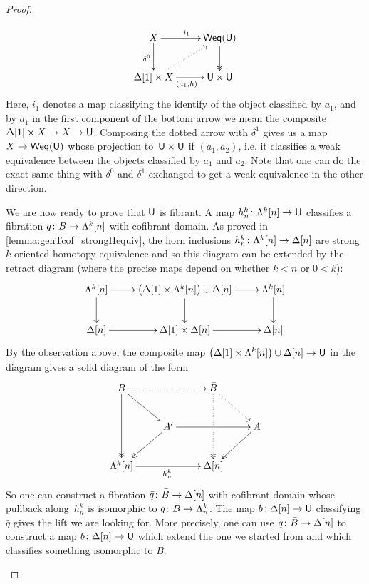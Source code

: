 \documentclass[reqno,10pt,a4paper,oneside,draft]{amsart}
\begin{document}
\begin{proof}
\begin{enumerate}[(i)]
\[
\xymatrix{ X \ar[r]^{i_1} \ar[d]_{\delta^0} & \mathsf{Weq}(\U) \ar@{->>}[d] \\
\Delta[1] \times X \ar[r]_{(a_1,h)} \ar@{.>}[ur] & \U \times \U
}
\]
Here, $i_1$ denotes a map classifying the identify of the object classified by $a_1$, and by $a_1$ in the first component of the bottom arrow we mean the composite $\Delta[1] \times X \rightarrow X \rightarrow \mathsf{U}$. Composing the dotted arrow with $\delta^1$ gives us a map $X \rightarrow  \mathsf{Weq}(\mathsf{U})$ whose projection to~$\mathsf{U} \times \mathsf{U}$ if $(a_1,a_2)$, i.e. it classifies a weak equivalence between the objects classified by $a_1$ and $a_2$. Note that one can do the exact same thing with $\delta^0$ and $\delta^1$ exchanged to get a weak equivalence in the other direction.


We are now ready to prove that $\mathsf{U}$ is fibrant. A map $h^k_n \colon \Lambda^k[n] \rightarrow \mathsf{U} $ classifies a fibration $q \colon B \rightarrow \Lambda^k[n]$ with cofibrant domain. As proved in \cref{lemma:genTcof_strongHequiv}, the horn inclusions $h^k_n \colon \Lambda^k [n] \rightarrow \Delta[n]$ are strong $k$-oriented homotopy equivalence and so this diagram can be extended by the retract diagram (where the precise maps depend on whether $k<n$ or $0 < k$):
\[
\xymatrix{\Lambda^k[n] \ar[d] \ar[r] & \big( \Delta[1] \times \Lambda^k[n] \big) \cup \Delta[n] \ar[d] \ar[r] & \Lambda^k[n] \ar[d]  \\
\Delta[n] \ar[r] & \Delta[1] \times \Delta[n] \ar[r] & \Delta[n] 
}\]
By the observation above, the composite map $\big( \Delta[1] \times \Lambda^k[n]  \big) \cup \Delta[n] \rightarrow \mathsf{U}$ in the diagram gives a solid diagram of the form
\[ 
\xymatrix{
  B
  \ar@{.>}[rr]
  \ar[dr]
  \ar@{->>}[dd]
&&
  \bar{B}
  \ar@{.>}[dr]
  \ar@{.>>}[dd]|{\hole}
&\\&
  A'
  \ar[rr]
  \ar@{->>}[dl]
&&
  A
  \ar@{->>}[dl]
\\
  \Lambda^k[n]
  \ar[rr]_{h^k_n}
&&
  \Delta[n]
&
}
\] 
So one can construct a fibration  $\bar{q} \colon \bar{B} \to \Delta[n]$ with cofibrant domain whose pullback 
along~$h^k_n$ is isomorphic to $q \colon B \to \Lambda^k_n$. The map $b \colon \Delta[n] \rightarrow \mathsf{U}$ classifying $\bar{q}$ gives the lift we are looking for. More precisely, one can use $q  \colon \bar{B} \to
\Delta[n]$ to construct  a map $b \colon \Delta[n] \rightarrow \mathsf{U}$ which extend the one we started from and which classifies something isomorphic to $\bar{B}$. \qedhere
\end{enumerate}
\end{proof}
\end{document}

